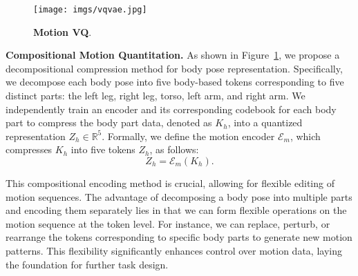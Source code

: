 \begin{figure}
  \centering
   \texttt{[image: imgs/vqvae.jpg]}
   \vspace{-5mm}
   \caption{\textbf{Motion VQ}. }
   \label{fig:motion vq}
   \vspace{-3mm}
\end{figure}

\textbf{Compositional Motion Quantitation.}
As shown in Figure~\ref{fig:motion vq}, we propose a decompositional compression method for body pose representation.
Specifically, we decompose each body pose into five body-based tokens corresponding to five distinct parts: the left leg, right leg, torso, left arm, and right arm. 
We independently train an encoder and its corresponding codebook for each body part to compress the body part data, denoted as $K_h$, into a quantized representation $Z_h \in \mathbb{R}^{5}$.
Formally, we define the motion encoder $\mathcal{E}_m$, which compresses $K_h$ into five tokens $Z_h$, as follows:
\begin{equation}
    Z_h = \mathcal{E}_m(K_h).
\end{equation}


This compositional encoding method is crucial, allowing for flexible editing of motion sequences. The advantage of decomposing a body pose into multiple parts and encoding them separately lies in that we can form flexible operations on the motion sequence at the token level. For instance, we can replace, perturb, or rearrange the tokens corresponding to specific body parts to generate new motion patterns. This flexibility significantly enhances control over motion data, laying the foundation for further task design.






